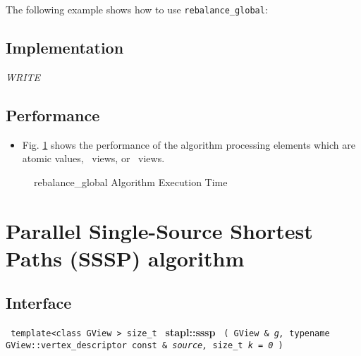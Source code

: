 The following example shows how to use 
\texttt{rebalance\_global}:


\subsection{Implementation} \label{sec-rebal-glob-alg-impl}

\textit{WRITE}

\subsection{Performance} \label{sec-rebal-glob-alg-perf}

\begin{itemize}
\item
Fig. \ref{fig:rebal-glob-alg-exec-exper}
shows the performance of the algorithm processing
elements which are atomic values, \stl\ views, or \stapl\ views.
\end{itemize}

\begin{figure}[p]
\caption{ rebalance\_global Algorithm Execution Time}
\label{fig:rebal-glob-alg-exec-exper}
\end{figure}


\section{Parallel Single-Source Shortest Paths (SSSP) algorithm}
\label{sec-sssp-alg}

\subsection{Interface} \label{sec-sssp-alg-inter}

\noindent
\texttt{%
template<class GView >
\newline
size\_t 
}
\newline
\textbf{stapl::sssp}%
\newline
\texttt{%
(
GView \&
\textit{g,}%
typename GView::vertex\_descriptor const \&
\textit{source,}%
size\_t 
\textit{k = 0}%
)     
}
\vspace{0.4cm}

